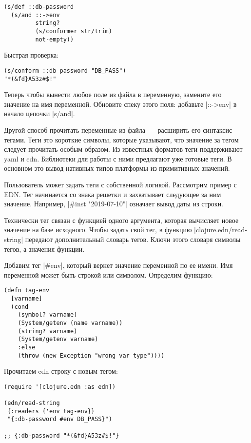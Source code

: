 \begin{verbatim}
(s/def ::db-password
  (s/and ::->env
         string?
         (s/conformer str/trim)
         not-empty))
\end{verbatim}

Быстрая проверка:

\begin{verbatim}
(s/conform ::db-password "DB_PASS")
"*(&fd}A53z#$!"
\end{verbatim}

Теперь чтобы вынести любое поле из файла в переменную, замените его значение на
имя переменной. Обновите спеку этого поля: добавьте \spverb|::->env| в начало цепочки
\spverb|s/and|.

Другой способ прочитать переменные из файла~--- расширить его синтаксис
тегами. Теги это короткие символы, которые указывают, что значение за тегом
следует прочитать особым образом. Из известных форматов теги поддерживают yaml и
edn. Библиотеки для работы с ними предлагают уже готовые теги. В основном это
вывод нативных типов платформы из примитивных значений.

Пользователь может задать теги с собственной логикой. Рассмотрим пример с
EDN. Тег начинается со знака решетки и захватывает следующее за ним
значение. Например, \spverb|#inst "2019-07-10"| означает вывод даты из строки.

Технически тег связан с функцией одного аргумента, которая вычисляет новое
значение на базе исходного. Чтобы задать свой тег, в функцию
\spverb|clojure.edn/read-string| передают дополнительный словарь тегов. Ключи этого
словаря символы тегов, а значения функции.

Добавим тег \spverb|#env|, который вернет значение переменной по ее имени. Имя
переменной может быть строкой или символом. Определим функцию:

\begin{verbatim}
(defn tag-env
  [varname]
  (cond
    (symbol? varname)
    (System/getenv (name varname))
    (string? varname)
    (System/getenv varname)
    :else
    (throw (new Exception "wrong var type"))))
\end{verbatim}

Прочитаем edn-строку с новым тегом:

\begin{verbatim}
(require '[clojure.edn :as edn])

(edn/read-string
 {:readers {'env tag-env}}
 "{:db-password #env DB_PASS}")

;; {:db-password "*(&fd}A53z#$!"}
\end{verbatim}

